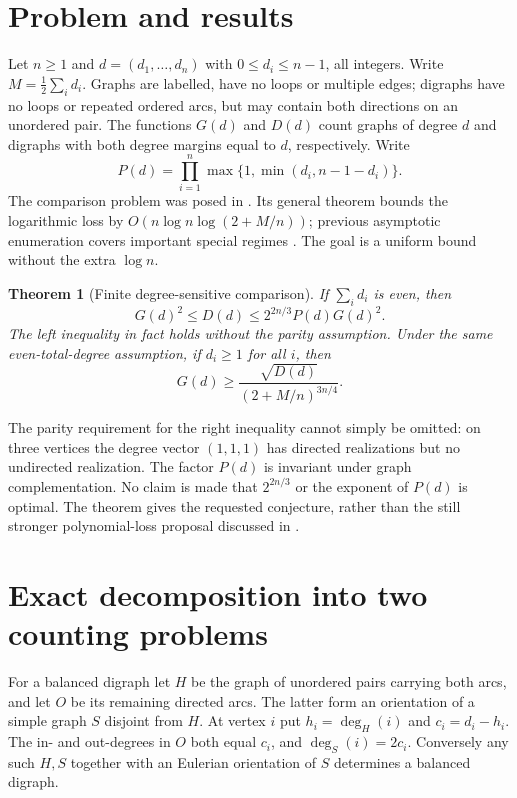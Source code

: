 \documentclass[11pt]{article}
\newtheorem{theorem}{Theorem}
\theoremstyle{remark}\newtheorem{remark}[theorem]{Remark}
\begin{document}
\section{Problem and results}
Let $n\ge1$ and $d=(d_1,\ldots,d_n)$ with $0\le d_i\le n-1$, all integers. Write $M=\tfrac12\sum_i d_i$. Graphs are labelled, have no loops or multiple edges; digraphs have no loops or repeated ordered arcs, but may contain both directions on an unordered pair. The functions $G(d)$ and $D(d)$ count graphs of degree $d$ and digraphs with both degree margins equal to $d$, respectively. Write
\[
 P(d)=\prod_{i=1}^n\max\{1,\min(d_i,n-1-d_i)\}.
\]
The comparison problem was posed in \cite[Conjecture 1.1]{mehrdad26}. Its general theorem bounds the logarithmic loss by $O(n\log n\log(2+M/n))$; previous asymptotic enumeration covers important special regimes \cite{barvinokhartigan,liebenauwormald}. The goal is a uniform bound without the extra $\log n$.
\begin{theorem}[Finite degree-sensitive comparison]\label{thm:main}
If $\sum_i d_i$ is even, then
\begin{equation}\label{eq:main}
G(d)^2\le D(d)\le 2^{2n/3}P(d)G(d)^2.
\end{equation}
The left inequality in fact holds without the parity assumption. Under the same even-total-degree assumption, if $d_i\ge1$ for all $i$, then
\begin{equation}\label{eq:conj}
G(d)\ge \frac{\sqrt{D(d)}}{(2+M/n)^{3n/4}}.
\end{equation}
\end{theorem}
The parity requirement for the right inequality cannot simply be omitted: on three vertices the degree vector $(1,1,1)$ has directed realizations but no undirected realization. The factor $P(d)$ is invariant under graph complementation. No claim is made that $2^{2n/3}$ or the exponent of $P(d)$ is optimal. The theorem gives the requested conjecture, rather than the still stronger polynomial-loss proposal discussed in \cite{mehrdad26}.

\section{Exact decomposition into two counting problems}
For a balanced digraph let $H$ be the graph of unordered pairs carrying both arcs, and let $O$ be its remaining directed arcs. The latter form an orientation of a simple graph $S$ disjoint from $H$. At vertex $i$ put $h_i=\deg_H(i)$ and $c_i=d_i-h_i$. The in- and out-degrees in $O$ both equal $c_i$, and $\deg_S(i)=2c_i$. Conversely any such $H,S$ together with an Eulerian orientation of $S$ determines a balanced digraph.
\end{document}
